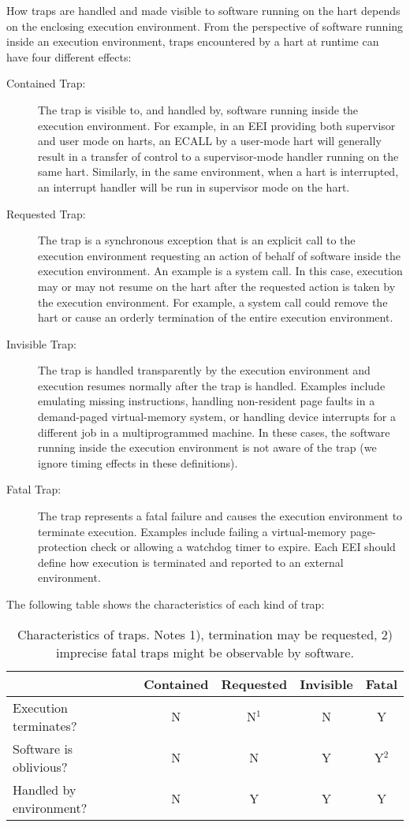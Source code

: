 How traps are handled and made visible to software running on the hart
depends on the enclosing execution environment.  From the perspective
of software running inside an execution environment, traps encountered
by a hart at runtime can have four different effects:
\begin{description}
  \item[Contained Trap:] The trap is visible to, and handled by,
    software running inside the execution environment.  For example,
    in an EEI providing both supervisor and user
    mode on harts, an ECALL by a user-mode hart will generally result
    in a transfer of control to a supervisor-mode handler running on
    the same hart.  Similarly, in the same environment, when a hart is
    interrupted, an interrupt handler will be run in supervisor mode
    on the hart.
  \item[Requested Trap:] The trap is a synchronous exception that is
    an explicit call to the execution environment requesting an action
    of behalf of software inside the execution environment.  An
    example is a system call.  In this case, execution may or may not
    resume on the hart after the requested action is taken by the
    execution environment.  For example, a system call could remove the
    hart or cause an orderly termination of the entire execution environment.
  \item[Invisible Trap:] The trap is handled transparently by the
    execution environment and execution resumes normally after the
    trap is handled.  Examples include emulating missing instructions,
    handling non-resident page faults in a demand-paged virtual-memory
    system, or handling device interrupts for a different job in a
    multiprogrammed machine.  In these cases, the software running
    inside the execution environment is not aware of the trap (we
    ignore timing effects in these definitions).
  \item[Fatal Trap:] The trap represents a fatal failure and causes
    the execution environment to terminate execution.  Examples
    include failing a virtual-memory page-protection check or allowing
    a watchdog timer to expire.  Each EEI should define how execution
    is terminated and reported to an external environment.
\end{description}

The following table shows the characteristics of each kind of trap:

\begin{table}[hbt]
  \centering
  \begin{tabular}{|l|c|c|c|c|}
      \hline
      & Contained & Requested & Invisible & Fatal\\
      \hline
      Execution terminates? & N & N$^{1}$ & N & Y \\
      Software is oblivious? & N & N & Y & Y$^{2}$ \\
      Handled by environment? & N & Y & Y & Y \\
      \hline
  \end{tabular}
  \caption{Characteristics of traps. Notes 1), termination may be
    requested, 2) imprecise fatal traps might be observable by software.}
\end{table}

